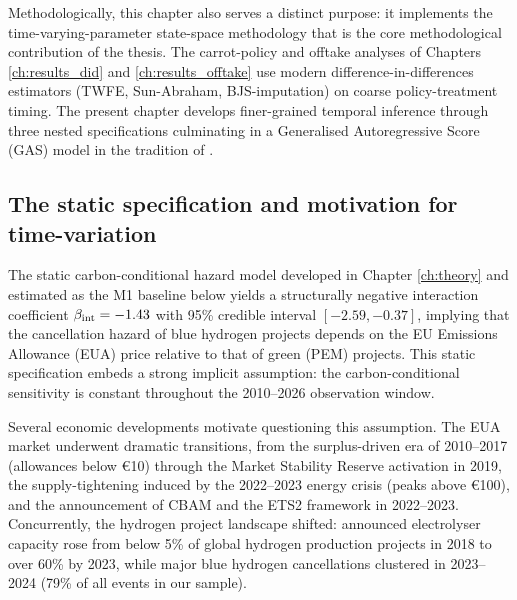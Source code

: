 Methodologically, this chapter also serves a distinct purpose: it implements the time-varying-parameter state-space methodology that is the core methodological contribution of the thesis. The carrot-policy and offtake analyses of Chapters \ref{ch:results_did} and \ref{ch:results_offtake} use modern difference-in-differences estimators (TWFE, Sun-Abraham, BJS-imputation) on coarse policy-treatment timing. The present chapter develops finer-grained temporal inference through three nested specifications culminating in a Generalised Autoregressive Score (GAS) model in the tradition of \cite{creal2008general,creal2013generalized,koopman2016predicting}.

\subsection*{The static specification and motivation for time-variation}

The static carbon-conditional hazard model developed in Chapter \ref{ch:theory} and estimated as the M1 baseline below yields a structurally negative interaction coefficient $\beta_{\mathrm{int}} = -1.43$ with 95\% credible interval $[-2.59, -0.37]$, implying that the cancellation hazard of blue hydrogen projects depends on the EU Emissions Allowance (EUA) price relative to that of green (PEM) projects. This static specification embeds a strong implicit assumption: the carbon-conditional sensitivity is constant throughout the 2010--2026 observation window.

Several economic developments motivate questioning this assumption. The EUA market underwent dramatic transitions, from the surplus-driven era of 2010--2017 (allowances below \euro 10) through the Market Stability Reserve activation in 2019, the supply-tightening induced by the 2022--2023 energy crisis (peaks above \euro 100), and the announcement of CBAM and the ETS2 framework in 2022--2023. Concurrently, the hydrogen project landscape shifted: announced electrolyser capacity rose from below 5\% of global hydrogen production projects in 2018 to over 60\% by 2023, while major blue hydrogen cancellations clustered in 2023--2024 (79\% of all events in our sample).

